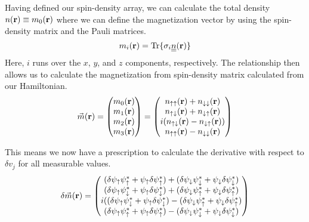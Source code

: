 \documentclass[10pt]{revtex4-1}
\newcommand{\bfr}{{\bf r}}
\newcommand{\ua}{\uparrow}
\newcommand{\da}{\downarrow}
\begin{document}
Having defined our spin-density array, we can calculate the total density $n(\bfr) \equiv m_0(\bfr)$ where we can define the magnetization vector by using the spin-density matrix and the Pauli matrices.
\begin{equation}
  m_i(\bfr) = \text{Tr}\{\sigma_i \underline{\underline{n}}(\bfr)\}
\end{equation}
Here, $i$ runs over the $x$, $y$, and $z$ components, respectively.
The relationship then allows us to calculate the magnetization from spin-density matrix calculated from our Hamiltonian.
\begin{equation}
  \vec{m}(\bfr) =
  \begin{pmatrix}
    m_0(\bfr) \\
    m_1(\bfr) \\
    m_2(\bfr) \\
    m_3(\bfr) \\
  \end{pmatrix}
  =
  \begin{pmatrix}
    n_{\ua \ua}(\bfr) + n_{\da \da}(\bfr) \\
    n_{\ua \da}(\bfr) + n_{\da \ua}(\bfr) \\
    i(n_{\ua \da}(\bfr) - n_{\da \ua}(\bfr)) \\
    n_{\ua \ua}(\bfr) - n_{\da \da}(\bfr) \\
  \end{pmatrix}
\end{equation}

This means we now have a prescription to calculate the derivative with respect to $\delta v_j$ for all measurable values.
\begin{equation}
  \delta \vec{m}(\bfr) =
  \begin{pmatrix}
    (\delta \psi_{\ua} \psi_{\ua}^* + \psi_{\ua} \delta \psi_{\ua}^*) + (\delta \psi_{\da} \psi_{\da}^* + \psi_{\da} \delta \psi_{\da}^*) \\
    (\delta \psi_{\ua} \psi_{\da}^* + \psi_{\ua} \delta \psi_{\da}^*) + (\delta \psi_{\da} \psi_{\ua}^* + \psi_{\da} \delta \psi_{\ua}^*) \\
    i((\delta \psi_{\ua} \psi_{\da}^* + \psi_{\ua} \delta \psi_{\da}^*) - (\delta \psi_{\da} \psi_{\ua}^* + \psi_{\da} \delta \psi_{\ua}^*) \\
    (\delta \psi_{\ua} \psi_{\ua}^* + \psi_{\ua} \delta \psi_{\ua}^*) - (\delta \psi_{\da} \psi_{\da}^* + \psi_{\da} \delta \psi_{\da}^*) \\
  \end{pmatrix}
\end{equation}

%
%
\end{document}
